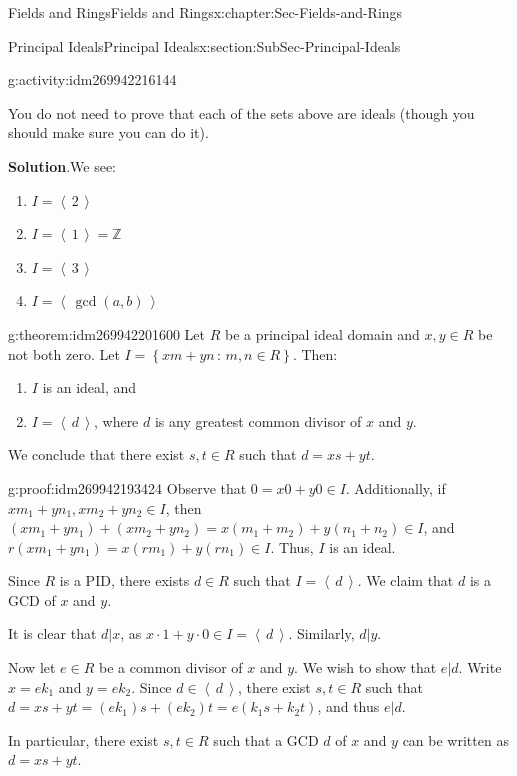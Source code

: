 \documentclass[oneside,10pt,]{book}
\numberwithin{equation}{section}
\newcommand{\ideal}[1]{\left\langle\, #1 \,\right\rangle}
\newcommand{\setof}[2]{{\left\{#1\,\colon\,#2\right\}}}
\def\Z{{\mathbb Z}}
\begin{document}
\begin{chapterptx}{Fields and Rings}{}{Fields and Rings}{}{}{x:chapter:Sec-Fields-and-Rings}
\begin{sectionptx}{Principal Ideals}{}{Principal Ideals}{}{}{x:section:SubSec-Principal-Ideals}
\begin{activity}{}{g:activity:idm269942216144}
\begin{enumerate}
\end{enumerate}
%
\par
You do not need to prove that each of the sets above are ideals (though you should make sure you can do it).%
\par\smallskip%
\noindent\textbf{Solution}.\hypertarget{g:solution:idm269942208096}{}\quad{}We see:%
\begin{enumerate}
\item{}\(I= \ideal{2}\)%
\item{}\(I = \ideal{1} = \Z\)%
\item{}\(I = \ideal{3}\)%
\item{}\(I = \ideal{\gcd(a,b)}\)%
\end{enumerate}
%
\end{activity}
\begin{theorem}{}{}{g:theorem:idm269942201600}%
Let \(R\) be a principal ideal domain and \(x,y\in R\) be not both zero. Let \(I = \setof{xm+yn}{m,n\in R}\). Then:%
\begin{enumerate}
\item{}\(I\) is an ideal, and%
\item{}\(I = \ideal{d}\), where \(d\) is any greatest common divisor of \(x\) and \(y\).%
\end{enumerate}
%
\par
We conclude that there exist \(s,t\in R\) such that \(d = xs + yt\).%
\end{theorem}
\begin{proofptx}{}{g:proof:idm269942193424}
Observe that \(0 = x0 + y0 \in I\). Additionally, if \(x m_1 + y n_1, x m_2 + y n_2\in I\), then \((x m_1 + y n_1) + (x m_2 + y n_2) = x (m_1 + m_2) + y (n_1 + n_2) \in I\), and \(r(x m_1 + y n_1) = x (rm_1) + y(rn_1) \in I\). Thus, \(I\) is an ideal.%
\par
Since \(R\) is a PID, there exists \(d\in R\) such that \(I = \ideal{d}\). We claim that \(d\) is a GCD of \(x\) and \(y\).%
\par
It is clear that \(d|x\), as \(x\cdot 1 + y\cdot 0\in I = \ideal{d}\). Similarly, \(d|y\).%
\par
Now let \(e\in R\) be a common divisor of \(x\) and \(y\). We wish to show that \(e|d\). Write \(x = e k_1\) and \(y = e k_2\). Since \(d\in \ideal{d}\), there exist \(s,t\in R\) such that \(d = x s + yt = (e k_1) s + (e k_2)t = e(k_1 s + k_2 t)\), and thus \(e|d\).%
\par
In particular, there exist \(s,t\in R\) such that a GCD \(d\) of \(x\) and \(y\) can be written as \(d = xs + yt\).%

\end{proofptx}
\end{sectionptx}
\end{chapterptx}
\end{document}
